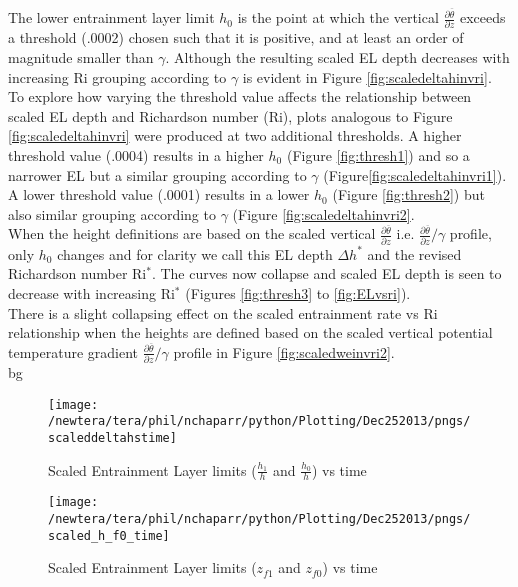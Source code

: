 The lower entrainment layer limit $h_{0}$ is the point at which the vertical 
$\frac{\partial \overline{\theta}}{\partial z}$ exceeds a threshold (.0002) chosen such that
it is positive, and at least an order of magnitude smaller than $\gamma$.   Although the resulting 
scaled \acs{EL} depth decreases with increasing \acs{Ri} grouping according to $\gamma$ is evident 
in Figure \ref{fig:scaledeltahinvri}.\\

To explore how varying the threshold value affects the relationship between scaled \acs{EL} depth
and Richardson number (\acs{Ri}), plots analogous to Figure \ref{fig:scaledeltahinvri} were produced at two 
additional thresholds.  A higher threshold value (.0004) results in a higher $h_{0}$ (Figure \ref{fig:thresh1})   
and so a narrower \acs{EL} but a similar grouping according to $\gamma$ (Figure\ref{fig:scaledeltahinvri1}).
A lower threshold value (.0001) results in a lower $h_{0}$ (Figure \ref{fig:thresh2})
but also similar grouping according to $\gamma$ (Figure \ref{fig:scaledeltahinvri2}.\\

When the height definitions are based on the scaled vertical $\frac{\partial \overline{\theta}}{\partial z}$
i.e. $\frac{\partial \overline{\theta}}{\partial z} / \gamma$ profile, only $h_{0}$ changes and for clarity we 
call this \acs{EL} depth $\Delta h^{*}$ and the revised Richardson number Ri$^{*}$.   The curves now collapse and 
scaled \acs{EL} depth is seen to decrease with increasing \acs{Ri}$^{*}$ (Figures \ref{fig:thresh3} to \ref{fig:ELvsri}).\\

There is a slight collapsing effect on the scaled entrainment rate vs \acs{Ri} relationship when
the heights are defined based on the scaled vertical potential temperature gradient 
$\frac{\partial \overline{\theta}}{\partial z} / \gamma$ profile in Figure \ref{fig:scaledweinvri2}.\\bg


\begin{figure}[htbp]
    \centering
    \texttt{[image: /newtera/tera/phil/nchaparr/python/Plotting/Dec252013/pngs/scaleddeltahstime]}
    \caption{Scaled Entrainment Layer limits ($\frac{h_{1}}{h}$ and $\frac{h_{0}}{h}$) vs time}
    \label{fig:scaledELlims}   %
\end{figure}

\begin{figure}[htbp]
    \centering
    \texttt{[image: /newtera/tera/phil/nchaparr/python/Plotting/Dec252013/pngs/scaled\_h\_f0\_time]}
    \caption{Scaled Entrainment Layer limits ($z_{f1}$ and $z_{f0}$) vs time}
    \label{fig:scaledELlims1}   %
\end{figure}

